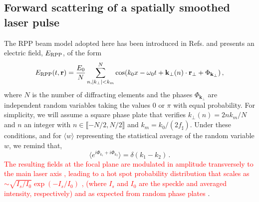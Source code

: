 \documentclass[
 reprint,
 superscriptaddress,
 amsmath,amssymb,
 aps,
]{revtex4-1}
\def\tc{\textcolor{red}}
\begin{document}
 \begin{widetext}
\section{Forward scattering of a spatially smoothed laser pulse}
\label{sec:diperpp}
The RPP beam model adopted here has been introduced in  Refs. \cite[]{POF_Schmitt_88,POF_Rose_93} and presents an electric field, $E_{\rm RPP}$, of the form
 \begin{align}
E_{\rm RPP}(t,\mathbf{r})  = \frac{E_0}{N} \sum_{n,\vert k_{\perp}\vert<k_m }^N  \cos(k_0x - \omega_0t +\mathbf{k}_\perp(n) \cdot \mathbf{r}_\perp +\Phi_{\mathbf{k}_\perp})\, , \label{eq:erpp}
 \end{align}
 where  $N$ is the number of diffracting elements and the phases $\Phi_{\mathbf{k}_\perp}$ are  independent random variables taking the values $0$ or $\pi$ with equal probability.
 For simplicity, we will assume a square phase plate that verifies $k_{\perp}(n) = 2nk_m/N$ and  $n$ an integer with $n\in \llbracket - N/2 ,N/2 \rrbracket$ and $k_m = k_0/(2f_\sharp)$. 
 Under these conditions, and for $\langle w\rangle$ representing the statistical average of the random variable $w$,  we remind that,
 \begin{equation}\label{eq:d}
 \langle e^{i\Phi_{k_1}+i\Phi_{k_2}}\rangle=\delta(k_1-k_2) \, . 
 \end{equation}
 \tc{The resulting  fields at the focal plane  are modulated in amplitude transversely to the main laser axis  \cite[]{Kato_1984}, leading to a hot spot probability distribution that scales as $\sim\sqrt{I_s/I_0}\exp(-I_s/I_0) $ \cite[]{POF_Rose_93}, (where $I_s$ and $I_0$ are the speckle and averaged intensity, respectively) and as expected from random phase plates \cite[]{Garnier_1999}}.


\end{widetext}
\end{document}
